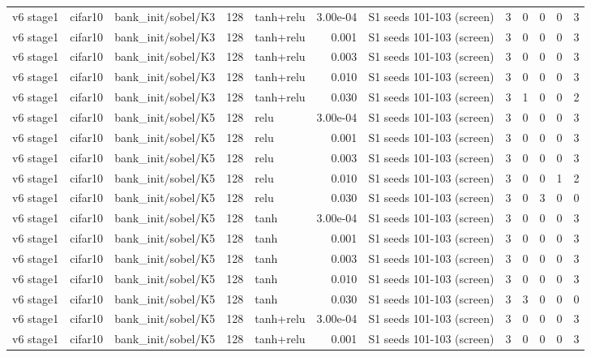 \begin{table}[htbp]
{\begin{tabular}{@{}lllrlrlrrrrr@{}}
v6 stage1 & cifar10 & bank\_init/sobel/K3 & 128 & tanh+relu & 3.00e-04 & S1 seeds 101-103 (screen) & 3 & 0 & 0 & 0 & 3 \\
v6 stage1 & cifar10 & bank\_init/sobel/K3 & 128 & tanh+relu & 0.001 & S1 seeds 101-103 (screen) & 3 & 0 & 0 & 0 & 3 \\
v6 stage1 & cifar10 & bank\_init/sobel/K3 & 128 & tanh+relu & 0.003 & S1 seeds 101-103 (screen) & 3 & 0 & 0 & 0 & 3 \\
v6 stage1 & cifar10 & bank\_init/sobel/K3 & 128 & tanh+relu & 0.010 & S1 seeds 101-103 (screen) & 3 & 0 & 0 & 0 & 3 \\
v6 stage1 & cifar10 & bank\_init/sobel/K3 & 128 & tanh+relu & 0.030 & S1 seeds 101-103 (screen) & 3 & 1 & 0 & 0 & 2 \\
v6 stage1 & cifar10 & bank\_init/sobel/K5 & 128 & relu & 3.00e-04 & S1 seeds 101-103 (screen) & 3 & 0 & 0 & 0 & 3 \\
v6 stage1 & cifar10 & bank\_init/sobel/K5 & 128 & relu & 0.001 & S1 seeds 101-103 (screen) & 3 & 0 & 0 & 0 & 3 \\
v6 stage1 & cifar10 & bank\_init/sobel/K5 & 128 & relu & 0.003 & S1 seeds 101-103 (screen) & 3 & 0 & 0 & 0 & 3 \\
v6 stage1 & cifar10 & bank\_init/sobel/K5 & 128 & relu & 0.010 & S1 seeds 101-103 (screen) & 3 & 0 & 0 & 1 & 2 \\
v6 stage1 & cifar10 & bank\_init/sobel/K5 & 128 & relu & 0.030 & S1 seeds 101-103 (screen) & 3 & 0 & 3 & 0 & 0 \\
v6 stage1 & cifar10 & bank\_init/sobel/K5 & 128 & tanh & 3.00e-04 & S1 seeds 101-103 (screen) & 3 & 0 & 0 & 0 & 3 \\
v6 stage1 & cifar10 & bank\_init/sobel/K5 & 128 & tanh & 0.001 & S1 seeds 101-103 (screen) & 3 & 0 & 0 & 0 & 3 \\
v6 stage1 & cifar10 & bank\_init/sobel/K5 & 128 & tanh & 0.003 & S1 seeds 101-103 (screen) & 3 & 0 & 0 & 0 & 3 \\
v6 stage1 & cifar10 & bank\_init/sobel/K5 & 128 & tanh & 0.010 & S1 seeds 101-103 (screen) & 3 & 0 & 0 & 0 & 3 \\
v6 stage1 & cifar10 & bank\_init/sobel/K5 & 128 & tanh & 0.030 & S1 seeds 101-103 (screen) & 3 & 3 & 0 & 0 & 0 \\
v6 stage1 & cifar10 & bank\_init/sobel/K5 & 128 & tanh+relu & 3.00e-04 & S1 seeds 101-103 (screen) & 3 & 0 & 0 & 0 & 3 \\
v6 stage1 & cifar10 & bank\_init/sobel/K5 & 128 & tanh+relu & 0.001 & S1 seeds 101-103 (screen) & 3 & 0 & 0 & 0 & 3 \\

\end{tabular}}
\end{table}
